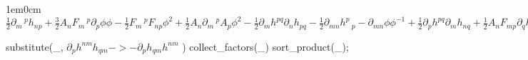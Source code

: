 \documentclass[12pt,a4paper,svgnames]{extarticle}
\begin{document}
\begin{adjustwidth}{1em}{0cm}${}\frac{1}{2}\partial_{m}\,^{p}{h_{n p}}+\frac{3}{2}A_{n} F_{m}\,^{p} \partial_{p}{\phi} \phi - \frac{1}{2}F_{m}\,^{p} F_{n p} {\phi}^{2}+\frac{1}{2}A_{n} \partial_{m}\,^{p}{A_{p}} {\phi}^{2} - \frac{1}{2}\partial_{m}{h^{p q}} \partial_{n}{h_{p q}} - \frac{1}{2}\partial_{m n}{h^{p}\,_{p}}-\partial_{m n}{\phi} {\phi}^{-1}+\frac{1}{2}\partial_{p}{h^{p q}} \partial_{m}{h_{n q}}+\frac{1}{2}A_{n} F_{m p} \partial_{q}{h^{p q}} {\phi}^{2}+\frac{1}{2}\partial_{n}{h_{m p}} \partial_{q}{h^{p q}}+\frac{1}{2}A_{m} F_{n p} \partial_{q}{h^{p q}} {\phi}^{2}+\frac{1}{2}\partial_{n}\,^{p}{h_{m p}}+\frac{3}{2}A_{m} F_{n}\,^{p} \partial_{p}{\phi} \phi+\frac{1}{2}A_{m} \partial_{n}\,^{p}{A_{p}} {\phi}^{2} - \frac{1}{2}\partial_{p}{h_{m n}} \partial_{q}{h^{p q}}-A_{m} A_{n} \partial_{p}{\phi} \partial_{q}{h^{p q}} \phi - \frac{1}{2}\partial^{p}\,_{p}{h_{m n}}-A_{m} A_{n} \partial^{p}\,_{p}{\phi} \phi - \frac{1}{2}A_{n} \partial^{p}\,_{p}{A_{m}} {\phi}^{2}%
 - \frac{1}{2}A_{m} \partial^{p}\,_{p}{A_{n}} {\phi}^{2} - \frac{1}{2}\partial^{p}{h_{m}\,^{r}} \partial_{r}{h_{n p}}+\frac{1}{2}A_{n} F^{p r} \partial_{p}{h_{m r}} {\phi}^{2}+\frac{1}{2}A_{m} F^{p r} \partial_{p}{h_{n r}} {\phi}^{2}+\frac{1}{4}A_{m} A_{n} F^{p r} F_{p r} {\phi}^{4}+\frac{1}{2}\partial^{p}{h_{m}\,^{r}} \partial_{p}{h_{n r}} - \frac{1}{4}\partial_{m}{h^{p r}} \partial_{n}{h_{p r}}+\frac{1}{4}\partial_{m}{h_{n}\,^{p}} \partial_{p}{h^{r}\,_{r}}+\frac{1}{4}A_{n} F_{m}\,^{p} \partial_{p}{h^{r}\,_{r}} {\phi}^{2}+\frac{1}{2}\partial^{p}{\phi} \partial_{m}{h_{n p}} {\phi}^{-1}+\frac{1}{4}\partial_{n}{h_{m}\,^{p}} \partial_{p}{h^{r}\,_{r}}+\frac{1}{4}A_{m} F_{n}\,^{p} \partial_{p}{h^{r}\,_{r}} {\phi}^{2}+\frac{1}{2}\partial^{p}{\phi} \partial_{n}{h_{m p}} {\phi}^{-1} - \frac{1}{4}\partial^{p}{h_{m n}} \partial_{p}{h^{r}\,_{r}} - \frac{1}{2}A_{m} A_{n} \partial^{p}{\phi} \partial_{p}{h^{r}\,_{r}} \phi - \frac{1}{2}\partial^{p}{\phi} \partial_{p}{h_{m n}} {\phi}^{-1}$\end{adjustwidth}
\begin{python}
substitute(_, $\partial_{p}{h^{n m}} h_{q m} -> - \partial_{p}{h_{q m}} h^{n m}$ )
collect_factors(_)
sort_product(_);
\end{python}
\end{document}
